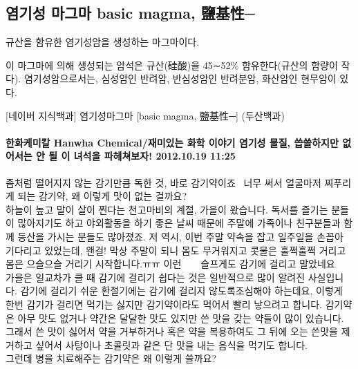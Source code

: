 \documentclass[12pt, a4paper, twoside]{book}
\begin{document}
	\subsection{염기성 마그마   basic magma, 鹽基性─  }

			규산을 함유한 염기성암을 생성하는 마그마이다. 

			이 마그마에 의해 생성되는 암석은 규산(硅酸)을 45∼52\% 함유한다(규산의 함량이 작다). 
			염기성암으로서는, 심성암인 반려암, 반심성암인 반려분암, 화산암인 현무암이 있다. 
			
			[네이버 지식백과] 염기성마그마 [basic magma, 鹽基性─] (두산백과)
			



	\clearpage  \null
	\paragraph{한화케미칼 Hanwha Chemical/재미있는 화학 이야기 염기성 물질, 씁쓸하지만 없어서는 안 될 이 녀석을 파헤쳐보자! 2012.10.19 11:25 }

 

 
 
				좀처럼 떨어지지 않는 감기만큼 독한 것, 바로 감기약이죠~
				     너무 써서 얼굴마저 찌푸리게 되는 감기약, 왜 이렇게 맛이 없는 걸까요?  \\
				 
				하늘이 높고 말이 살이 찐다는 천고마비의 계절, 가을이 왔습니다. 
				독서를 즐기는 분들이 많아지기도 하고 야외활동을 하기 좋은 날씨 때문에 주말에 가족이나 친구분들과 함께 등산을 가시는 분들도 많아졌죠. 
				저 역시, 이번 주말 약속을 잡고 일주일을 손꼽아 기다리고 있었는데, 왠걸! 막상 주말이 되니 몸도 무거워지고 콧물은 훌쩍훌쩍 거리고 몸은 으슬으슬 거리기 시작합니다.ㅠㅠ 이런 ~ ~  슬프게도 감기에 걸리고 말았네요   \\
				 
				가을은 일교차가 클 때 감기에 걸리기 쉽다는 것은 일반적으로 많이 알려진 사실입니다. 
				감기에 걸리기 쉬운 환절기에는 감기에 걸리지 않도록조심해야 하는데요, 이렇게 한번 감기가 걸리면 먹기는 싫지만 감기약이라도 먹어서 빨리 낳으려고 합니다. 
				감기약은 아무 맛도 없거나 약간은 달달한 맛도 있지만 쓴 맛을 갖는 약들이 많이 있습니다. 
				그래서 쓴 맛이 싫어서 약을 거부하거나 혹은 약을 복용하여도 그 뒤에 오는 쓴맛을 제거하고 싶어서 사탕이나 초콜릿과 같은 단 맛을 내는 음식을 먹기도 합니다. \\
				 
				그런데 병을 치료해주는 감기약은 왜 이렇게 쓸까요? \\
				 
\end{document}

